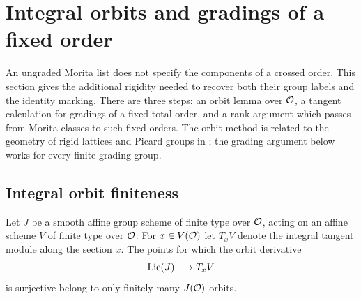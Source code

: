 \section{Integral orbits and gradings of a fixed order}\label{sec:rigidity}

An ungraded Morita list does not specify the components of a crossed
order.  This section gives the additional rigidity needed to recover
both their group labels and the identity marking.  There are three
steps: an orbit lemma over $\mathcal O$, a tangent calculation for gradings
of a fixed total order, and a rank argument which passes from Morita
classes to such fixed orders.  The orbit method is related to the
geometry of rigid lattices and Picard groups in
\cite{EiseleGeometry2022}; the grading argument below works for every
finite grading group.

\subsection{Integral orbit finiteness}

\begin{lemma}\label{lem:orbit}
Let $J$ be a smooth affine group scheme of finite type over $\mathcal O$,
acting on an affine scheme $V$ of finite type over $\mathcal O$.  For
$x\in V(\mathcal O)$ let $T_xV$ denote the integral tangent module along
the section $x$.  The points for which the orbit derivative
\[
 \operatorname{Lie}(J)\longrightarrow T_xV
\]
is surjective belong to only finitely many $J(\mathcal O)$-orbits.
\end{lemma}

